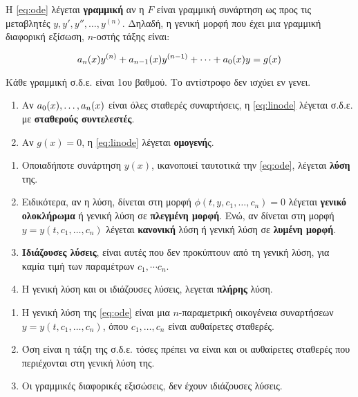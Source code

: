 \begin{dfn}
Η \eqref{eq:ode} λέγεται \textbf{γραμμική} αν η $F$ είναι γραμμική συνάρτηση ως προς τις μεταβλητές $y,y',y'',\ldots, y^{(n)}$. Δηλαδή, η γενική μορφή που έχει μια γραμμική διαφορική εξίσωση, $n$-οστής τάξης είναι:

\begin{equation}\label{eq:linode}
a_n(x)y^{(n)}+a_{n-1}(x)y^{(n-1)}+\cdots +a_0(x)y=g(x)
\end{equation}
\end{dfn}

\begin{remark}
Κάθε γραμμική σ.δ.ε. είναι 1ου βαθμού. Το αντίστροφο δεν ισχύει εν γενει. 
\end{remark}

\begin{dfns}
\begin{enumerate}
\item Αν $a_0(x),\ldots ,a_n(x)$ είναι όλες σταθερές συναρτήσεις, η \eqref{eq:linode} λέγεται σ.δ.ε. με \textbf{σταθερούς συντελεστές}.

\item Αν $g(x)=0$, η \eqref{eq:linode} λέγεται \textbf{ομογενή}ς.
\end{enumerate}
\end{dfns}

\begin{dfns}
\begin{enumerate}
\item Οποιαδήποτε συνάρτηση $y(x)$, ικανοποιεί ταυτοτικά την \eqref{eq:ode}, λέγεται \textbf{λύση} της. 

\item Ειδικότερα, αν η λύση, δίνεται στη μορφή $\phi(t,y,c_1,\ldots,c_n)=0$ λέγεται \textbf{γενικό ολοκλήρωμα} ή γενική λύση σε \textbf{πλεγμένη μορφή}. Ενώ, αν δίνεται στη μορφή $y=y(t,c_1,\dots,c_n)$ λέγεται \textbf{κανονική} λύση ή γενική λύση σε \textbf{λυμένη μορφή}.

\item \textbf{Ιδιάζουσες λύσεις}, είναι αυτές που δεν προκύπτουν από τη γενική λύση, για καμία τιμή των παραμέτρων $c_1,\cdots c_n$.

\item Η γενική λύση και οι ιδιάζουσες λύσεις, λεγεται \textbf{πλήρης} λύση.
\end{enumerate}
\end{dfns}


\begin{remarks}
\begin{enumerate}
\item Η γενική λύση της \eqref{eq:ode} είναι μια $n$-παραμετρική οικογένεια συναρτήσεων $y=y(t,c_1,\ldots,c_n)$, όπου $c_1,\ldots,c_n$ είναι αυθαίρετες σταθερές. 

\item Όση είναι η τάξη της σ.δ.ε. τόσες πρέπει να είναι και οι αυθαίρετες σταθερές που περιέχονται στη γενική λύση της.

\item Οι γραμμικές διαφορικές εξισώσεις, δεν έχουν ιδιάζουσες λύσεις.
\end{enumerate}
\end{remarks}

